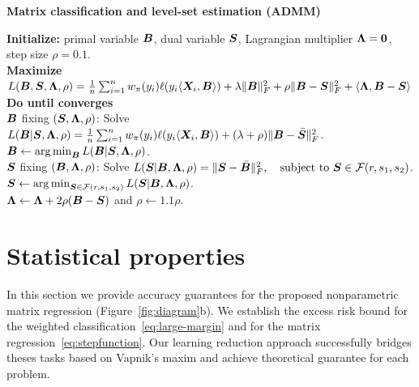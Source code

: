 \documentclass[11pt]{article}
\theoremstyle{definition}
\begin{document}
 \begin{algorithm}[h]
  \caption{{\bf Matrix classification and level-set estimation (ADMM)} } \label{alg:weighted}
{\bf Initialize:} primal variable $\bm B$, dual variable $\bm S$, Lagrangian multiplier $\bm{\Lambda}=\mathbf{0}$, step size $\rho=0.1$.\\
{\bf Maximize} $
L(\bm B,\bm S,\bm{\Lambda},\rho)={1\over n}\sum_{i=1}^nw_\pi(y_i)\ell(y_i\langle \bm X_i,\bm B \rangle) + \lambda\lVert\bm B\rVert_F^2+\rho\lVert\bm B-\bm S\rVert_F^2+\langle \bm{\Lambda}, \bm B-\bm S\rangle$\\
{\bf Do until converges}\\[.1cm]
\hspace*{.2cm}{\bf Update} $\bm B$ fixing $(\bm S,\bm{\Lambda},\rho)$: Solve $L(\bm B|\bm S,\bm{\Lambda},\rho)={1\over n}\sum_{i=1}^n w_\pi(y_i)\ell(y_i\langle\bm X_i,\bm B\rangle)+(\lambda+\rho)\lVert\bm B-\bar {\bm S}\rVert_F^2$.\\
\hspace{.2cm} $\bm B \leftarrow \operatorname*{arg\,min}_{\bm B} L(\bm B|\bm S,\bm{\Lambda},\rho)$.\\[.2cm]
\hspace*{.2cm}{\bf Update} $\bm S$ fixing $(\bm B,\bm{\Lambda},\rho)$: Solve  $ L(\bm S|\bm B,\bm{\Lambda},\rho)=\lVert\bm S-\bar {\bm B}\rVert_F^2,\quad \text{subject to }\bm S\in\mathcal{F}(r,s_1,s_2)$.\\
\hspace{.2cm} $\bm S \leftarrow  \operatorname*{arg\,min}_{\bm S\in \mathcal{F}(r,s_1,s_2)}L(\bm S|\bm B,\bm{\Lambda},\rho)$.\\[.1cm]
\hspace*{.2cm}{\bf Update} $\bm{\Lambda} \leftarrow \bm{\Lambda}+2\rho(\bm B-\bm S)$ and  $\rho\leftarrow1.1\rho$.\\[.2cm]
\end{algorithm}


\vspace{-.5cm}
\section{Statistical properties}\label{sec:theory}
\vspace{-.5cm}
In this section we provide accuracy guarantees for the proposed nonparametric matrix regression (Figure~\ref{fig:diagram}b). We establish the excess risk bound for the weighted classification~\eqref{eq:large-margin} and for the matrix regression~\eqref{eq:stepfunction}. Our learning reduction approach successfully bridges theses tasks based on Vapnik’s maxim and achieve theoretical guarantee for each problem. 
\end{document}
